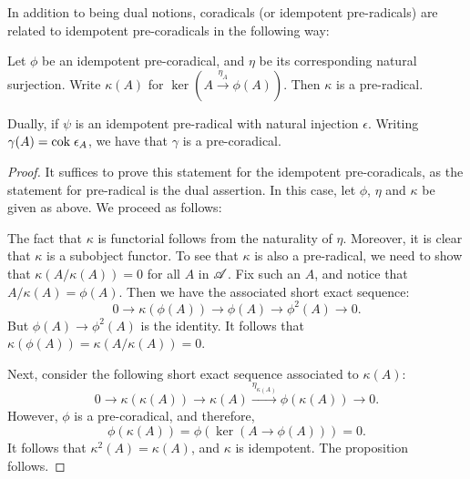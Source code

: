 In addition to being dual notions, coradicals (or idempotent 
pre-radicals) are related to idempotent pre-coradicals in the
following way:

\begin{prop}\label{prop_rad_eq_corad}
Let $\phi$ be an idempotent pre-coradical, and $\eta$ be its 
corresponding natural surjection. Write $\kappa(A)$ for $\ker (A 
\stackrel{\eta_A}{\to} \phi(A))$. Then $\kappa$ is a pre-radical.

Dually, if $\psi$ is an idempotent pre-radical with natural 
injection $\epsilon$. Writing $\gamma(A) = \mathrm{cok}\; \epsilon_A$, we 
have that $\gamma$ is a pre-coradical.
\end{prop}
\begin{proof}
It suffices to prove this statement for the idempotent 
pre-coradicals, as the statement for pre-radical is 
the dual assertion. In this case, let $\phi$, 
$\eta$ and $\kappa$ be given as above. We proceed as follows:

The fact that $\kappa$ is functorial follows from the naturality 
of $\eta$. Moreover, it is clear that $\kappa$ is a subobject 
functor. To see that $\kappa$ is also a pre-radical, we need to 
show that $\kappa(A/\kappa(A)) = 0$ for all $A$ in $\mathscr{A}$. Fix 
such an $A$, and notice that $A/\kappa(A) = \phi(A)$. Then we have 
the associated short exact sequence:
\[
0 \to \kappa(\phi(A)) \to \phi(A) \to \phi^2(A) \to 0.
\]
But $\phi(A) \to \phi^2(A)$ is the identity. It follows that 
$\kappa(\phi(A)) = \kappa(A/\kappa(A)) = 0$.

Next, consider the following short exact sequence associated to 
$\kappa(A)$:
\[
0 \to \kappa(\kappa(A)) \to \kappa(A) 
   \stackrel{\eta_{\kappa(A)}}{\to} \phi(\kappa(A)) \to 0.
\]
However, $\phi$ is a pre-coradical, and therefore, 
\[
\phi(\kappa(A)) = \phi(\ker(A \to \phi(A))) = 0.
\]
It follows that $\kappa^2(A) = \kappa(A)$, and $\kappa$ is 
idempotent. The proposition follows.
\end{proof}

